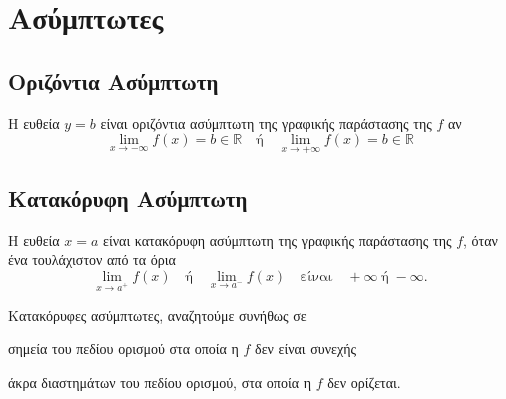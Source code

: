





\newcommand{\twocolumnsidesch}[2]{\begin{minipage}[c]{0.45\linewidth}\raggedright
    #1
    \end{minipage}\hfill\begin{minipage}[c]{0.45\linewidth}\raggedright
    #2
\end{minipage}}

\everymath{\displaystyle}
\pagestyle{askhseis}




\begin{center}
  \minibox{\large\bfseries \textcolor{Col1}{Θεωρία - Συνοπτικά}}
\end{center}

\vspace{\baselineskip}


\section*{Ασύμπτωτες}

\subsection*{Οριζόντια Ασύμπτωτη}

\begin{dfn}
  Η ευθεία $ y=b $ είναι \textcolor{Col1}{οριζόντια ασύμπτωτη} της γραφικής παράστασης 
  της $f$ αν 
  \[ 
    \lim_{x \to - \infty} f(x) = b \in \mathbb{R} \quad \text{ή} \quad 
    \lim_{x \to + \infty} f(x) = b \in \mathbb{R}
  \]
\end{dfn}

\subsection*{Κατακόρυφη Ασύμπτωτη}

\begin{dfn}
  Η ευθεία $ x=a $ είναι \textcolor{Col1}{κατακόρυφη ασύμπτωτη} της γραφικής παράστασης 
  της $f$, όταν ένα τουλάχιστον από τα όρια 
  \[
    \lim_{x \to a^{+}} f(x) \quad \text{ή} \quad \lim_{x \to a^{-}} f(x) \quad
    \text{είναι} \quad  + \infty  \; \text{ή} \;  - \infty .
  \] 
\end{dfn}

\begin{rem}
  Κατακόρυφες ασύμπτωτες, αναζητούμε συνήθως σε 
  \begin{myitemize}
    \item σημεία του πεδίου ορισμού στα οποία η $f$ δεν είναι συνεχής 
    \item άκρα διαστημάτων του πεδίου ορισμού, στα οποία η $f$ δεν ορίζεται.
  \end{myitemize}
\end{rem}

